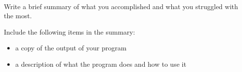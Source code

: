 \documentclass[12pt]{article}
\begin{document}
\begin{description}[labelindent=1cm]
\newpage
\item[\textbf{\underline{Challenge Summary:}}] \hfill \vspace{3mm}\\ 
Write a brief summary of what you accomplished and what you struggled with the most. 

Include the following items in the summary:
\begin{itemize}

\item a copy of the output of your program
\item a description of what the program does and how to use it

\end{itemize}


%
%
%
%
%


\end{description}
\end{document}
